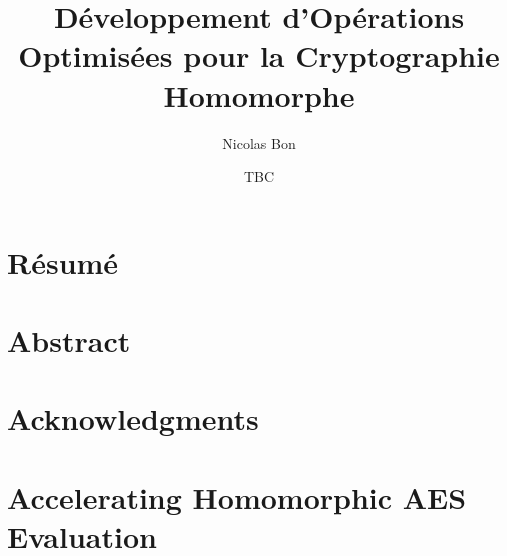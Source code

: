 \documentclass[11pt, twoside, openright]{thesis}
\title{Développement d'Opérations Optimisées pour la Cryptographie Homomorphe}
\institute{l’École Normale Supérieure de Paris}
\author{Nicolas Bon}
\date{TBC}
\begin{document}
\frontmatter 
\hypersetup{pageanchor=false}
\maketitle
\hypersetup{pageanchor=true}
\dominitoc



\cleardoublepage
\chapter*{Résumé}
\thefrabstract{}
\vfill
\thefrkeywords{}
\cleardoublepage
\chapter*{Abstract}
\theenabstract{}
\vfill
\theenkeywords{}

\cleardoublepage
\chapter*{Acknowledgments}

\cleardoublepage
\hypertarget{contents}{}
\tableofcontents


\mainmatter


























\chapter{Accelerating Homomorphic AES Evaluation}
\label{chap:hyppogriph}

\end{document}
